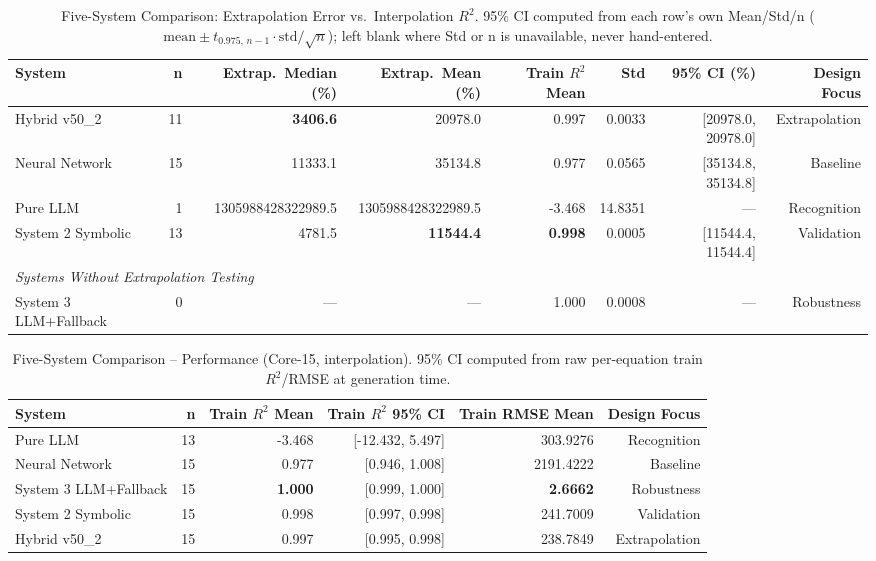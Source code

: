 \begin{table}[t]
\centering
\caption{Five-System Comparison: Extrapolation Error vs.\ Interpolation $R^2$.
  95\% CI computed from each row's own Mean/Std/n
  ($\mathrm{mean} \pm t_{0.975,\,n-1} \cdot \mathrm{std}/\sqrt{n}$); left
  blank where Std or n is unavailable, never hand-entered.}
\label{tab:five_systems_full}
\begin{tabular}{lrrrrrrr}
\toprule
\textbf{System} & \textbf{n}
  & \textbf{Extrap.\ Median (\%)} & \textbf{Extrap.\ Mean (\%)}
  & \textbf{Train $R^2$ Mean} & \textbf{Std} & \textbf{95\% CI (\%)}
  & \textbf{Design Focus} \\
\midrule
Hybrid v50\_2 & 11 & \textbf{3406.6} & 20978.0 & 0.997 & 0.0033 & [20978.0, 20978.0] & Extrapolation \\
Neural Network & 15 & 11333.1 & 35134.8 & 0.977 & 0.0565 & [35134.8, 35134.8] & Baseline \\
Pure LLM & 1 & 1305988428322989.5 & 1305988428322989.5 & -3.468 & 14.8351 & --- & Recognition \\
System 2 Symbolic & 13 & 4781.5 & \textbf{11544.4} & \textbf{0.998} & 0.0005 & [11544.4, 11544.4] & Validation \\
\midrule
\multicolumn{8}{l}{\textit{Systems Without Extrapolation Testing}} \\
System 3 LLM+Fallback & 0 & --- & --- & 1.000 & 0.0008 & --- & Robustness \\
\bottomrule
\end{tabular}
\end{table}

\begin{table}[t]
\centering
\caption{Five-System Comparison -- Performance (Core-15, interpolation).
  95\% CI computed from raw per-equation train $R^2$/RMSE at generation time.}
\label{tab:five_systems_performance}
\begin{tabular}{lrrrrr}
\toprule
\textbf{System} & \textbf{n} & \textbf{Train $R^2$ Mean}
  & \textbf{Train $R^2$ 95\% CI} & \textbf{Train RMSE Mean}
  & \textbf{Design Focus} \\
\midrule
Pure LLM & 13 & -3.468 & [-12.432, 5.497] & 303.9276 & Recognition \\
Neural Network & 15 & 0.977 & [0.946, 1.008] & 2191.4222 & Baseline \\
System 3 LLM+Fallback & 15 & \textbf{1.000} & [0.999, 1.000] & \textbf{2.6662} & Robustness \\
System 2 Symbolic & 15 & 0.998 & [0.997, 0.998] & 241.7009 & Validation \\
Hybrid v50_2 & 15 & 0.997 & [0.995, 0.998] & 238.7849 & Extrapolation \\
\bottomrule
\end{tabular}
\end{table}


